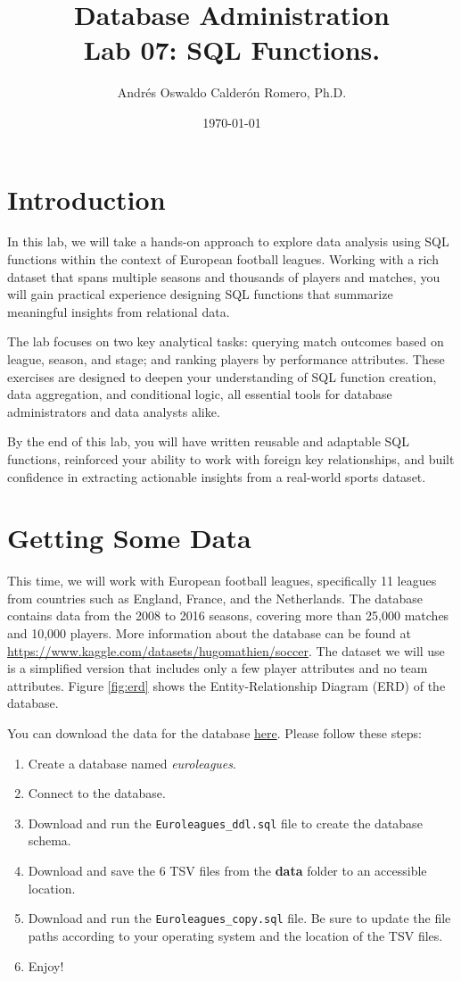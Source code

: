\documentclass{article}
\title{Database Administration \\ Lab 07: SQL Functions.}
\author{Andrés Oswaldo Calderón Romero, Ph.D.}
\date{\today}
\begin{document}
\maketitle

\section{Introduction}
In this lab, we will take a hands-on approach to explore data analysis using SQL functions within the context of European football leagues. Working with a rich dataset that spans multiple seasons and thousands of players and matches, you will gain practical experience designing SQL functions that summarize meaningful insights from relational data.

The lab focuses on two key analytical tasks: querying match outcomes based on league, season, and stage; and ranking players by performance attributes. These exercises are designed to deepen your understanding of SQL function creation, data aggregation, and conditional logic, all essential tools for database administrators and data analysts alike.

By the end of this lab, you will have written reusable and adaptable SQL functions, reinforced your ability to work with foreign key relationships, and built confidence in extracting actionable insights from a real-world sports dataset.

\section{Getting Some Data}
This time, we will work with European football leagues, specifically 11 leagues from countries such as England, France, and the Netherlands. The database contains data from the 2008 to 2016 seasons, covering more than 25,000 matches and 10,000 players.
More information about the database can be found at \url{https://www.kaggle.com/datasets/hugomathien/soccer}. The dataset we will use is a simplified version that includes only a few player attributes and no team attributes. Figure \ref{fig:erd} shows the Entity-Relationship Diagram (ERD) of the database.

You can download the data for the database \href{https://drive.google.com/drive/folders/12KoKu76ZDpIoDtE78Lc6g6Y2y0zTJJbO?usp=sharing}{here}. Please follow these steps:

\begin{enumerate}
    \item Create a database named \textit{euroleagues}.
    \item Connect to the database.
    \item Download and run the \texttt{Euroleagues\_ddl.sql} file to create the database schema.
    \item Download and save the 6 TSV files from the \textbf{data} folder to an accessible location.
    \item Download and run the \texttt{Euroleagues\_copy.sql} file. Be sure to update the file paths according to your operating system and the location of the TSV files.
    \item Enjoy!
\end{enumerate}
\end{document}
